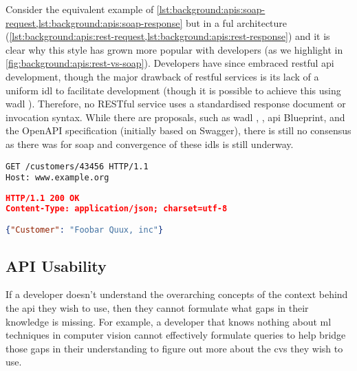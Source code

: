 \noindent
Consider the equivalent example of \cref{lst:background:apis:soap-request,lst:background:apis:soap-response} but in a ful architecture (\cref{lst:background:apis:rest-request,lst:background:apis:rest-response}) and it is clear why this style has grown more popular with developers (as we highlight in \cref{fig:background:apis:rest-vs-soap}). Developers have since embraced \gls{rest}ful \gls{api} development, though the major drawback of \gls{rest}ful services is its lack of a uniform \gls{idl} to facilitate development (though it is possible to achieve this using \gls{wadl} \citep{Mandel:2008ww}).  Therefore, no RESTful service uses a standardised response document or invocation syntax. While there are proposals, such as \gls{wadl} \citep{Hadley:2006vv}, , \gls{api} Blueprint, and the OpenAPI specification (initially based on Swagger), there is still no consensus as there was for \gls{soap} and convergence of these \glspl{idl} is still underway.

\begin{lstlisting}[label=lst:background:apis:rest-request,caption={[An example RESTful request]An equivalent \glsac{http} consumer request to that of \cref{lst:background:apis:soap-request}, but using \gls{rest}. Source: \citep{Ballinger:2014aa}.}]
GET /customers/43456 HTTP/1.1
Host: www.example.org
\end{lstlisting}
\begin{lstlisting}[language=json,label=lst:background:apis:rest-response,caption={[An example RESTful response]The \gls{rest} \glsac{http} service provider response for \cref{lst:background:apis:rest-request}.}]
HTTP/1.1 200 OK
Content-Type: application/json; charset=utf-8

{"Customer": "Foobar Quux, inc"}
\end{lstlisting}


\subsection{API Usability}
\label{ssec:background:api:usability}

If a developer doesn't understand the overarching concepts of the context behind the \gls{api} they wish to use, then they cannot formulate what gaps in their knowledge is missing. For example, a developer that knows nothing about \gls{ml} techniques in computer vision cannot effectively formulate queries to help bridge those gaps in their understanding to figure out more about the \gls{cvs} they wish to use. 

